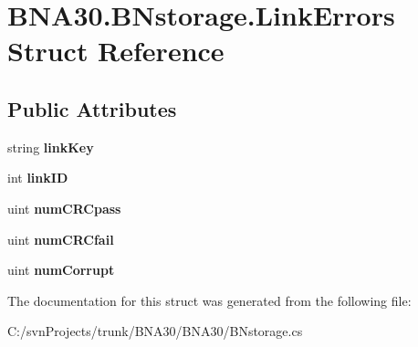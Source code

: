 \hypertarget{struct_b_n_a30_1_1_b_nstorage_1_1_link_errors}{}\section{B\+N\+A30.\+B\+Nstorage.\+Link\+Errors Struct Reference}
\label{struct_b_n_a30_1_1_b_nstorage_1_1_link_errors}
\subsection*{Public Attributes}
\begin{DoxyCompactItemize}
\item 
\mbox{\label{struct_b_n_a30_1_1_b_nstorage_1_1_link_errors_a7237bd13bc310ab0e40715c83e78327f}} 
string {\bfseries link\+Key}
\item 
\mbox{\label{struct_b_n_a30_1_1_b_nstorage_1_1_link_errors_a607bfab0f157436a694d7422d52c77e8}} 
int {\bfseries link\+ID}
\item 
\mbox{\label{struct_b_n_a30_1_1_b_nstorage_1_1_link_errors_aabbc8b947b00709cce15d5076123d896}} 
uint {\bfseries num\+C\+R\+Cpass}
\item 
\mbox{\label{struct_b_n_a30_1_1_b_nstorage_1_1_link_errors_a5b0b6d11d4ae6e7ac9e03a0cc25ad07a}} 
uint {\bfseries num\+C\+R\+Cfail}
\item 
\mbox{\label{struct_b_n_a30_1_1_b_nstorage_1_1_link_errors_af19ccc93e2d729bd26703e82cc4be6b9}} 
uint {\bfseries num\+Corrupt}
\end{DoxyCompactItemize}


The documentation for this struct was generated from the following file\+:\begin{DoxyCompactItemize}
\item 
C\+:/svn\+Projects/trunk/\+B\+N\+A30/\+B\+N\+A30/B\+Nstorage.\+cs\end{DoxyCompactItemize}
